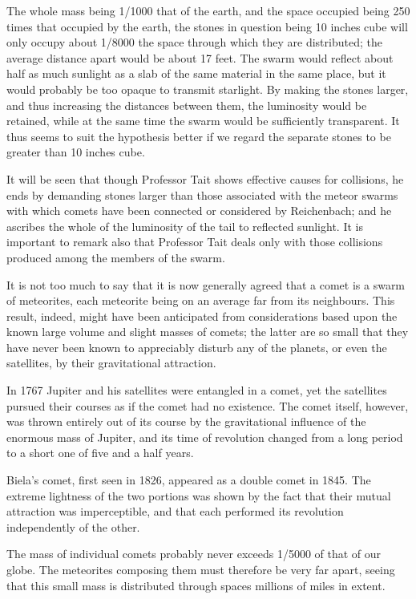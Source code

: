 \documentclass[a4paper, 12pt, oneside, polutonikogreek, english]{article}
\begin{document}
The whole mass being 1/1000 that of the earth, and the space occupied being 250 times that occupied by the earth, the stones in question being 10 inches cube will only occupy about 1/8000 the space through which they are distributed; the average distance apart would be about 17 feet. The swarm would reflect about half as much sunlight as a slab of the same material in the same place, but it would probably be too opaque to transmit starlight. By making the stones larger, and thus increasing the distances between them, the luminosity would be retained, while at the same time the swarm would be sufficiently transparent. It thus seems to suit the hypothesis better if we regard the separate stones to be greater than 10 inches cube.

It will be seen that though Professor Tait shows effective causes for collisions, he ends by demanding stones larger than those associated with the meteor swarms with which comets have been connected or considered by Reichenbach; and he ascribes the whole of the luminosity of the tail to reflected sunlight. It is important to remark also that Professor Tait deals only with those collisions produced among the members of the swarm.

It is not too much to say that it is now generally agreed that a comet is a swarm of meteorites, each meteorite being on an average far from its neighbours. This result, indeed, might have been anticipated from considerations based upon the known large volume and slight masses of comets; the latter are so small that they have never been known to appreciably disturb any of the planets, or even the satellites, by their gravitational attraction.

In 1767 Jupiter and his satellites were entangled in a comet, yet the satellites pursued their courses as if the comet had no existence. The comet itself, however, was thrown entirely out of its course by the gravitational influence of the enormous mass of Jupiter, and its time of revolution changed from a long period to a short one of five and a half years.

Biela's comet, first seen in 1826, appeared as a double comet in 1845. The extreme lightness of the two portions was shown by the fact that their mutual attraction was imperceptible, and that each performed its revolution independently of the other.

The mass of individual comets probably never exceeds 1/5000 of that of our globe. The meteorites composing them must therefore be very far apart, seeing that this small mass is distributed through spaces millions of miles in extent.
\end{document}
